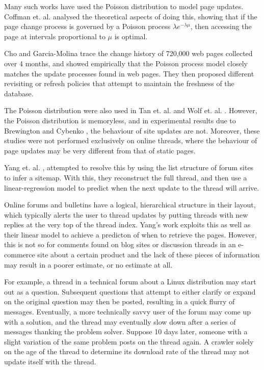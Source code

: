 \documentclass[12 pt]{article}
\begin{document}
Many such works have used the Poisson distribution to model page updates. Coffman et. al. \cite{Coffman1997} analysed the theoretical aspects of doing this, showing that if the page change process is governed by a Poisson process $\lambda e^{-\lambda \mu}$, then accessing the page at intervals proportional to $\mu$ is optimal.

Cho and Garcia-Molina trace the change history of 720,000 web pages collected over 4 months, and showed empirically that the Poisson process model closely matches the update processes found in web pages\cite{Cho1999}. They then proposed different revisiting or refresh policies \cite{Cho2003,Garcia-molina2003} that attempt to maintain the freshness of the database.


The Poisson distribution were also used in Tan et. al. \cite{Tan2007} and Wolf et. al. \cite{Wolf2002}. %
However, the Poisson distribution is memoryless, and in experimental results due to Brewington and Cybenko \cite{Brian2000}, the behaviour of site updates are not. Moreover, these studies were not performed exclusively on online threads, where the behaviour of page updates may be very different from that of static pages.

Yang et. al. \cite{Yang2009}, attempted to resolve this by using the list structure of forum sites to infer a sitemap. With this, they reconstruct the full thread, and then use a linear-regression model to predict when the next update to the thread will arrive. %

Online forums and bulletins have a logical, hierarchical structure in their layout, which typically alerts the user to thread updates by putting threads with new replies at the very top of the thread index. Yang's work exploits this as well as their linear model to achieve a predicton of when to retrieve the pages.
However, this is not so for comments found on blog sites or discussion threads in an e-commerce site about a certain product and the lack of these pieces of information may result in a poorer estimate, or no estimate at all.

For example, a thread in a technical forum about a Linux distribution may start out as a question. Subsequent questions that attempt to either clarify or expand on the original question may then be posted, resulting in a quick flurry of messages. Eventually, a more technically savvy user of the forum may come up with a solution, and the thread may eventually slow down after a series of messages thanking the problem solver. Suppose 10 days later, someone with a slight variation of the same problem posts on the thread again. A crawler solely on the age of the thread to determine its download rate of the thread may not update itself with the thread.
\end{document}
